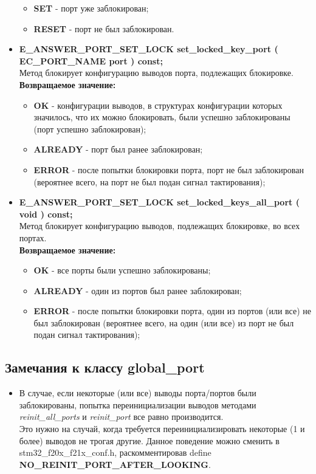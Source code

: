 \begin{itemize}
	\begin{itemize}
		\item \textbf{SET} - порт уже заблокирован;
		\item \textbf{RESET} - порт не был заблокирован.
	\end{itemize}
	\item \textbf{E\_ANSWER\_PORT\_SET\_LOCK	set\_locked\_key\_port	( EC\_PORT\_NAME port ) const;}\\Метод блокирует конфигурацию выводов порта, подлежащих блокировке.\\\textbf{Возвращаемое значение:}
	\begin{itemize}
		\item \textbf{OK} - конфигурации выводов, в структурах конфигурации которых значилось, что их можно блокировать, были успешно заблокированы (порт успешно заблокирован);
		\item \textbf{ALREADY} - порт был ранее заблокирован;
		\item \textbf{ERROR} - после попытки блокировки порта, порт не был заблокирован (вероятнее всего, на порт не был подан сигнал тактирования);
	\end{itemize}
	\item \textbf{E\_ANSWER\_PORT\_SET\_LOCK	set\_locked\_keys\_all\_port	( void ) const; }\\Метод блокирует конфигурацию выводов, подлежащих блокировке, во всех портах.\\\textbf{Возвращаемое значение:}
	\begin{itemize}
		\item \textbf{OK} - все порты были успешно заблокированы;
		\item \textbf{ALREADY} - один из портов был ранее заблокирован;
		\item \textbf{ERROR} - после попытки блокировки порта, один из портов (или все) не был заблокирован (вероятнее всего, на один (или все) из порт не был подан сигнал тактирования);
	\end{itemize}
\end{itemize}

\subsection{Замечания к классу global\_port}
\begin{itemize}
	\item В случае, если некоторые (или все) выводы порта/портов были заблокированы, попытка переинициализации выводов методами \textit{reinit\_all\_ports} и \textit{reinit\_port} все равно производится.\\Это нужно на случай, когда требуется переинициализировать некоторые (1 и более) выводов не трогая другие. Данное поведение можно сменить в stm32\_f20x\_f21x\_conf.h, раскомментировав define  \textbf{NO\_\-REINIT\_\-PORT\_\-AFTER\_\-LOOKING}.
\end{itemize}
